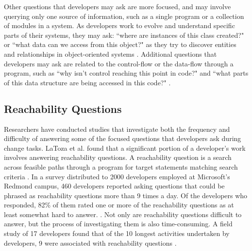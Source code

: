 \par Other questions that developers may ask are more focused, and may involve
querying only one source of information, such as a single program or a
collection of modules in a system.
As developers work to evolve and understand specific parts of their systems,
they may ask: ``where are instances of this class created?" or
``what data can we access from this object?" as they try to discover entities
and relationships in object-oriented systems
\cite{sillito-2006-questions-during-task}.
Additional questions that developers may ask are related to 
the control-flow or the data-flow through a program, such as 
``why isn't control reaching this point in code?" and 
``what parts of this data structure are being accessed in this code?" 
\cite{sillito-2006-questions-during-task}.

\subsection{Reachability Questions}
\label{subsec:ReachabilityQuestions}

\par Researchers have conducted studies that investigate both the 
frequency and difficulty of answering some of the focused questions that 
developers ask during change tasks.
LaToza et al. found that a significant portion of a developer's work involves 
answering reachability questions.
A reachability question is a search across feasible paths through a program for 
target statements matching search criteria \cite{latoza-2010-reach}.
In a survey distributed to 2000 developers employed at Microsoft's Redmond
campus, 460 developers reported asking questions that could be phrased as 
reachability questions more than 9 times a day.
Of the developers who responded, 82\% of them rated one or more of the
reachability questions as at least somewhat hard to answer.
\cite{latoza-2010-reach}.
Not only are reachability questions difficult to answer, but the process of
investigating them is also time-consuming.
A field study of 17 developers found that of the 10 longest activities
undertaken by developers, 9 were associated with reachability questions
\cite{latoza-2010-reach}.

